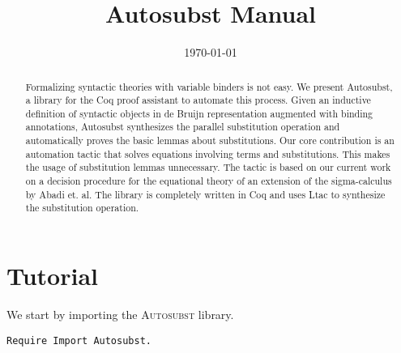 \documentclass{scrartcl}
\newcommand{\Autosubst}{\textsc{Autosubst}\xspace}
\begin{document}
\title{Autosubst Manual}
\date{\today}
\maketitle

\begin{abstract}
  Formalizing syntactic theories with variable binders is not easy. We present Autosubst, a library for the Coq proof assistant to automate this process. Given an inductive definition of syntactic objects in de Bruijn representation augmented with binding annotations, Autosubst synthesizes the parallel substitution operation and automatically proves the basic lemmas about substitutions. Our core contribution is an automation tactic that solves equations involving terms and substitutions. This makes the usage of substitution lemmas unnecessary. The tactic is based on our current work on a decision procedure for the equational theory of an extension of the sigma-calculus by Abadi et. al. The library is completely written in Coq and uses Ltac to synthesize the substitution operation.
\end{abstract}

\section{Tutorial}
\label{sec:Tutorial}

We start by importing the \Autosubst library.
\begin{lstlisting}
Require Import Autosubst.
\end{lstlisting}
\end{document}
